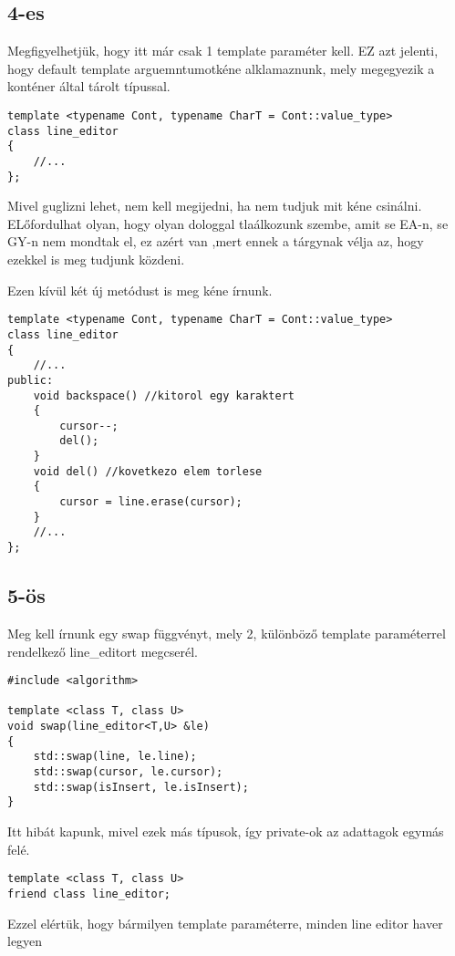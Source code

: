 \documentclass[a4paper,11.5pt,table]{article}
\begin{document}
	\subsection{4-es}
	Megfigyelhetjük, hogy itt már csak 1 template paraméter kell. EZ azt jelenti, hogy default template arguemntumotkéne alklamaznunk, mely megegyezik a konténer által tárolt típussal.
\begin{lstlisting}
template <typename Cont, typename CharT = Cont::value_type>
class line_editor
{
	//...
};
\end{lstlisting}
	 Mivel guglizni lehet, nem kell megijedni, ha nem tudjuk mit kéne csinálni. ELőfordulhat olyan, hogy olyan dologgal tlaálkozunk szembe, amit se EA-n, se GY-n nem mondtak el, ez azért van ,mert ennek a tárgynak vélja az, hogy ezekkel is meg tudjunk közdeni.
	 
	Ezen kívül két új metódust is meg kéne írnunk.
\begin{lstlisting}
template <typename Cont, typename CharT = Cont::value_type>
class line_editor
{
	//...
public:	
	void backspace() //kitorol egy karaktert
	{
		cursor--;
		del();
	}
	void del() //kovetkezo elem torlese
	{
		cursor = line.erase(cursor);
	}
	//...
};
\end{lstlisting}
	\subsection{5-ös}
	Meg kell írnunk egy swap függvényt, mely 2, különböző template paraméterrel rendelkező line\_editort megcserél.
	\begin{lstlisting}
#include <algorithm>
	
template <class T, class U>
void swap(line_editor<T,U> &le)
{
	std::swap(line, le.line);
	std::swap(cursor, le.cursor);
	std::swap(isInsert, le.isInsert);
}
	\end{lstlisting}
	Itt hibát kapunk, mivel ezek más típusok, így private-ok az adattagok egymás felé.
	\begin{lstlisting}
template <class T, class U>
friend class line_editor;
	\end{lstlisting}
	Ezzel elértük, hogy bármilyen template paraméterre, minden line editor haver legyen
\end{document}
